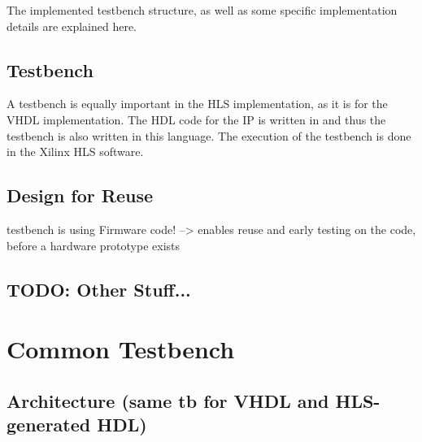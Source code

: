 The implemented testbench structure, as well as some specific implementation details are explained here.

\subsection{Testbench}

A testbench is equally important in the HLS implementation, as it is for the VHDL implementation.
The HDL code for the IP is written in \cplusplus and thus the testbench is also written in this language.
The execution of the testbench is done in the Xilinx HLS software.\\


\subsection{Design for Reuse}

testbench is using Firmware code! --> enables reuse and early testing on the code, before a hardware prototype exists

\subsection{TODO: Other Stuff...}

\section{Common Testbench}

\subsection{Architecture (same tb for VHDL and HLS-generated HDL)}
